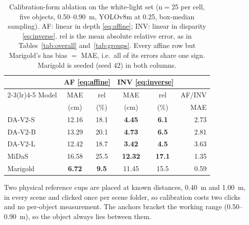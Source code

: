 \documentclass[conference]{IEEEtran}
\begin{document}
\begin{table}[!t]
\centering
\caption{Calibration-form ablation on the white-light set (n$=$25 per cell, five
objects, 0.50--0.90~m, YOLOv8m at 0.25, box-median sampling). AF: linear in depth
\eqref{eq:affine}; INV: linear in disparity \eqref{eq:inverse}. rel is the mean
absolute relative error, as in Tables~\ref{tab:overall} and~\ref{tab:groups}.
Every affine row but Marigold's has bias $=$ MAE, i.e.\ all of its errors share
one sign. Marigold is seeded (seed 42) in both columns.}
\label{tab:calib}
\footnotesize
\setlength{\tabcolsep}{3.5pt}
\begin{tabular}{lccccr}
\toprule
 & \multicolumn{2}{c}{AF \eqref{eq:affine}} & \multicolumn{2}{c}{INV \eqref{eq:inverse}} & \\
\cmidrule(lr){2-3}\cmidrule(lr){4-5}
Model & MAE & rel & MAE & rel & AF/INV\\
      & (cm) & (\%) & (cm) & (\%) & MAE\\
\midrule
DA-V2-S & 12.16 & 18.1 & \textbf{4.45} & \textbf{6.1} & 2.73\\
DA-V2-B & 13.29 & 20.1 & \textbf{4.73} & \textbf{6.5} & 2.81\\
DA-V2-L & 12.42 & 18.7 & \textbf{3.42} & \textbf{4.5} & 3.63\\
MiDaS & 16.58 & 25.5 & \textbf{12.32} & \textbf{17.1} & 1.35\\
Marigold & \textbf{6.72} & \textbf{9.5} & 11.45 & 15.5 & 0.59\\
\bottomrule
\end{tabular}
\end{table}

Two physical reference cups are placed at known distances, 0.40~m and 1.00~m, in
every scene and clicked once per scene folder, so calibration costs two clicks
and no per-object measurement. The anchors bracket the working range
(0.50--0.90~m), so the object always lies between them.
\end{document}
